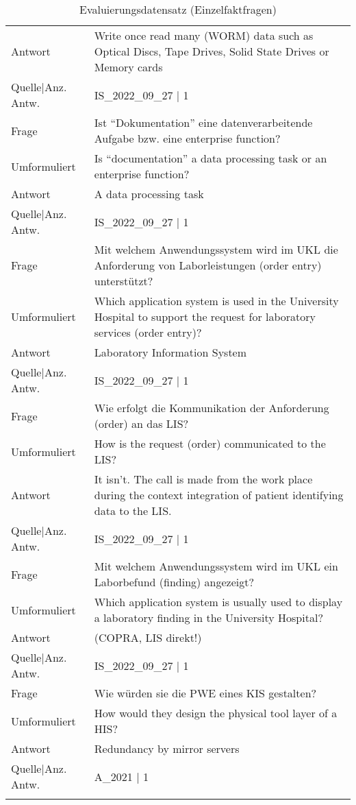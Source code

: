 {\begin{landscape}
\begin{longtable}{p{3cm}p{}}
    Antwort & Write once read many (WORM) data such as Optical Discs, Tape Drives, Solid State Drives or Memory cards \\
    Quelle|Anz. Antw. & IS\_2022\_09\_27 | 1 \\
    \midrule
    Frage & Ist ``Dokumentation'' eine datenverarbeitende Aufgabe bzw.
    eine enterprise function? \\
    Umformuliert & Is ``documentation'' a data processing task or an enterprise function? \\
    Antwort & A data processing task \\
    Quelle|Anz. Antw. & IS\_2022\_09\_27 | 1 \\
    \midrule
    Frage & Mit welchem Anwendungssystem wird im UKL die Anforderung von Laborleistungen  (order entry) unterstützt? \\
    Umformuliert & Which application system is used in the University Hospital to support the request for laboratory services (order entry)? \\
    Antwort & Laboratory Information System \\
    Quelle|Anz. Antw. & IS\_2022\_09\_27 | 1 \\
    \midrule
    Frage & Wie erfolgt die Kommunikation der Anforderung (order) an das LIS? \\
    Umformuliert & How is the request (order) communicated to the LIS? \\
    Antwort & It isn't. The call is made from the work place during the context integration of patient identifying data to the LIS.\\
    Quelle|Anz. Antw. & IS\_2022\_09\_27 | 1 \\
    \midrule
    Frage & Mit welchem Anwendungssystem wird im UKL ein Laborbefund (finding) angezeigt? \\
    Umformuliert & Which application system is usually used to display a laboratory finding in the University Hospital? \\
    Antwort & (COPRA, LIS direkt!) \\
    Quelle|Anz. Antw. & IS\_2022\_09\_27 | 1 \\
    \midrule
    Frage & Wie würden sie die PWE eines KIS gestalten? \\
    Umformuliert & How would they design the physical tool layer of a HIS? \\
    Antwort & Redundancy by mirror servers \\
    Quelle|Anz. Antw. & A\_2021 | 1\\
\bottomrule
\caption*{Evaluierungsdatensatz (Einzelfaktfragen)}\label{tab:evaldata-single}
\end{longtable}
\end{landscape}

}
